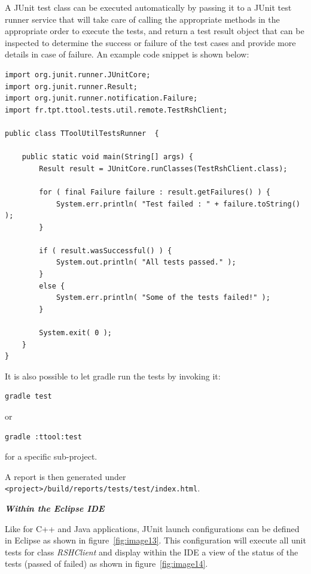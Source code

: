 \documentclass[12pt]{article}
\begin{document}
A JUnit test class can be executed automatically by passing
it to a JUnit test runner service that will take care of calling the appropriate
methods in the appropriate order to execute the tests, and return a test result
object that can be inspected to determine the success or failure of the test
cases and provide more details in case of failure. An example code snippet is
shown below:

\begin{verbatim}
import org.junit.runner.JUnitCore;
import org.junit.runner.Result;
import org.junit.runner.notification.Failure;
import fr.tpt.ttool.tests.util.remote.TestRshClient;

public class TToolUtilTestsRunner  {

    public static void main(String[] args) {
        Result result = JUnitCore.runClasses(TestRshClient.class);

        for ( final Failure failure : result.getFailures() ) { 
            System.err.println( "Test failed : " + failure.toString() );
        }
 		
        if ( result.wasSuccessful() ) {
            System.out.println( "All tests passed." );
        }
        else {
            System.err.println( "Some of the tests failed!" );
        }
 
        System.exit( 0 );
    }
}
\end{verbatim}

It is also possible to let gradle run the tests by invoking it:
\begin{verbatim}
gradle test
\end{verbatim}
or
\begin{verbatim}
gradle :ttool:test
\end{verbatim}

for a specific sub-project.

A report is then generated under
\texttt{<project>/build/reports/tests/test/index.html}.

\textbf{\emph{Within the Eclipse IDE}}

Like for C++ and Java applications, JUnit launch configurations can be defined
in Eclipse as shown in figure~\ref{fig:image13}. This configuration will execute all unit tests
for class \textit{RSHClient} and display within the IDE a view of the status of
the tests (passed of failed) as shown in figure~\ref{fig:image14}.
\end{document}
